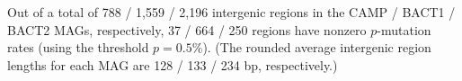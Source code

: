 Out of a total of 788 / 1,559 / 2,196 intergenic regions in the CAMP / BACT1 / BACT2 MAGs, respectively, 37 / 664 / 250 regions have nonzero $p$-mutation rates (using the threshold $p=0.5\%$). (The rounded average intergenic region lengths for each MAG are 128 / 133 / 234 bp, respectively.)\endinput